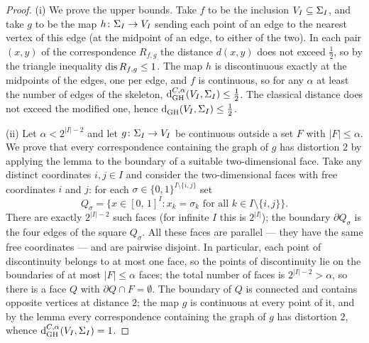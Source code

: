 \begin{proof}
    (i) We prove the upper bounds.
    Take $f$ to be the inclusion $V_I \subseteq \S_I$, and take $g$ to be the map $h \: \S_I \to V_I$ sending each point of an edge to the nearest vertex of this edge (at the midpoint of an edge, to either of the two).
    In each pair $(x, y)$ of the correspondence $R_{f,g}$ the distance $d(x, y)$ does not exceed $\frac12$, so by the triangle inequality $\dis R_{f,g} \le 1$.
    The map $h$ is discontinuous exactly at the midpoints of the edges, one per edge, and $f$ is continuous, so for any $\alpha$ at least the number of edges of the skeleton, $\dGH{C,\alpha}(V_I, \S_I) \le \frac12$.
    The classical distance does not exceed the modified one, hence $\dGH{}(V_I, \S_I) \le \frac12$.

    (ii) Let $\alpha < 2^{|I|-2}$ and let $g \: \S_I \to V_I$ be continuous outside a set $F$ with $|F| \le \alpha$.
    We prove that every correspondence containing the graph of $g$ has distortion $2$ by applying the lemma to the boundary of a suitable two-dimensional face.
    Take any distinct coordinates $i, j \in I$ and consider the two-dimensional faces with free coordinates $i$ and $j$: for each $\sigma \in {\{0, 1\}}^{I \setminus \{i, j\}}$ set
    $$
    Q_\sigma = \bigl\{x \in {[0,\, 1]}^I : x_k = \sigma_k \text{ for all } k \in I \setminus \{i, j\}\bigr\}.
    $$
    There are exactly $2^{|I|-2}$ such faces (for infinite $I$ this is $2^{|I|}$); the boundary $\partial Q_\sigma$ is the four edges of the square $Q_\sigma$.
    All these faces are parallel --- they have the same free coordinates --- and are pairwise disjoint.
    In particular, each point of discontinuity belongs to at most one face, so the points of discontinuity lie on the boundaries of at most $|F| \le \alpha$ faces; the total number of faces is $2^{|I|-2} > \alpha$, so there is a face $Q$ with $\partial Q \cap F = \emptyset$.
    The boundary of $Q$ is connected and contains opposite vertices at distance $2$; the map $g$ is continuous at every point of it, and by the lemma every correspondence containing the graph of $g$ has distortion $2$, whence $\dGH{C,\alpha}(V_I, \S_I) = 1$.
  \end{proof}
